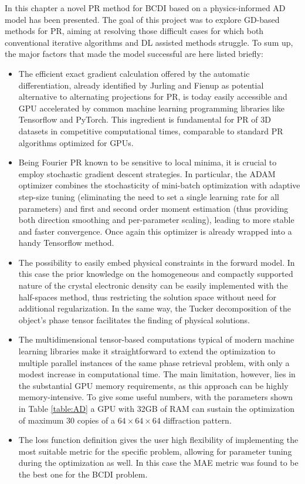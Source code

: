 In this chapter a novel PR method for BCDI based on a physics-informed AD model has been presented. The goal of this 
project was to explore GD-based methods for PR, aiming at resolving those difficult cases for which both conventional 
iterative algorithms and DL assisted methods struggle. To sum up, 
the major factors that made the model successful are here listed briefly: 
\begin{itemize}

  \item The efficient exact gradient calculation offered by the automatic differentiation, already identified by Jurling and 
  Fienup as potential alternative to alternating projections for PR, is today easily accessible and GPU accelerated by common 
  machine learning programming libraries like Tensorflow and PyTorch. This ingredient is fundamental for PR of 3D datasets 
  in competitive computational times, comparable to standard PR algorithms optimized for GPUs. 

  \item Being Fourier PR known to be sensitive to local minima, it is crucial to employ stochastic gradient descent 
  strategies. In particular, the ADAM optimizer combines the stochasticity of mini-batch optimization with adaptive 
  step-size tuning (eliminating the need to set a single learning rate for all parameters) and first and second order 
  moment estimation (thus providing both direction smoothing and per-parameter scaling), leading to more stable and 
  faster convergence. Once again this optimizer is already wrapped into a handy Tensorflow method. 

  \item The possibility to easily embed physical constraints in the forward model. In this case the prior knowledge on the 
  homogeneous and compactly supported nature of the crystal electronic density can be easily implemented with the half-spaces 
  method, thus restricting the solution space without need for additional regularization. In the same way, the Tucker 
  decomposition of the object's phase tensor facilitates the finding of physical solutions. 

  \item The multidimensional tensor-based computations typical of modern machine learning libraries make it straightforward 
  to extend the optimization to multiple parallel instances of the same phase retrieval problem, with only a modest 
  increase in computational time. The main limitation, however, lies in the substantial GPU memory requirements, as 
  this approach can be highly memory-intensive. To give some useful numbers, with the parameters shown in Table \ref{table:AD} 
  a GPU with 32GB of RAM can sustain the optimization of maximum 30 copies of a $64\times 64\times 64$ diffraction pattern. 

  \item The loss function definition gives the user high flexibility of implementing the most suitable metric for the 
  specific problem, allowing for parameter tuning during the optimization as well. In this case the MAE metric was found to be the 
  best one for the BCDI problem.  
  
\end{itemize}

